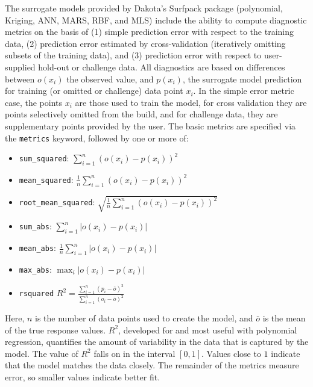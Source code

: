 The surrogate models provided by Dakota's Surfpack package
(polynomial, Kriging, ANN, MARS, RBF, and MLS) include the ability to
compute diagnostic metrics on the basis of (1) simple prediction error
with respect to the training data, (2) prediction error estimated by
cross-validation (iteratively omitting subsets of the training data),
and (3) prediction error with respect to user-supplied hold-out or
challenge data.  All diagnostics are based on differences between
$o(x_i)$ the observed value, and $p(x_i)$, the surrogate model
prediction for training (or omitted or challenge) data point $x_i$.
In the simple error metric case, the points $x_i$ are those used to
train the model, for cross validation they are points selectively
omitted from the build, and for challenge data, they are supplementary
points provided by the user.  The basic metrics are specified via the
{\tt metrics} keyword, followed by one or more of:

\begin{itemize}
\item {\tt sum\_squared}: $\sum_{i=1}^{n}{ \left( o(x_i) - p(x_i) \right) ^2}$

\item {\tt mean\_squared}: $\frac{1}{n}\sum_{i=1}^{n}{ \left( o(x_i) - p(x_i) \right) ^2}$

\item {\tt root\_mean\_squared}: $\sqrt{\frac{1}{n}\sum_{i=1}^{n}{ \left( o(x_i) - p(x_i) \right) ^2}}$

\item {\tt sum\_abs}: $\sum_{i=1}^{n}{ \left| o(x_i) - p(x_i) \right| }$

\item {\tt mean\_abs}: $\frac{1}{n}\sum_{i=1}^{n}{ \left| o(x_i) - p(x_i) \right| }$

\item {\tt max\_abs}: $\max_i \left| o(x_i) - p(x_i) \right|$

\item {\tt rsquared} $ R^2 = \frac{\sum_{i=1}^{n}{\left(p_i -
        \bar{o}\right)^2}}{ \sum_{i=1}^{n}{\left(o_i -
        \bar{o}\right)^2}}$
\end{itemize}

Here, $n$ is the number of data points used to create the model, and
$\bar{o}$ is the mean of the true response values.  $R^2$, developed
for and most useful with polynomial regression, quantifies the amount
of variability in the data that is captured by the model.  The value
of $R^2$ falls on in the interval $[0,1]$.  Values close to $1$
indicate that the model matches the data closely.  The remainder of
the metrics measure error, so smaller values indicate better fit.

